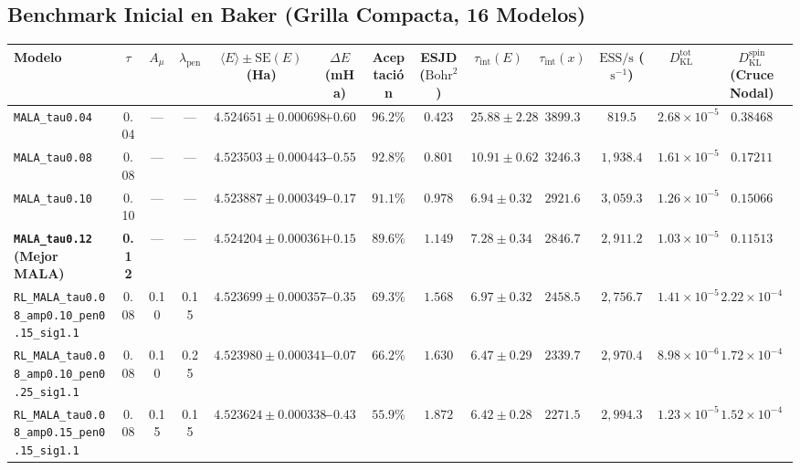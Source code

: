 \documentclass[10pt,a4paper]{article}
\begin{document}
\subsection{Benchmark Inicial en Baker (Grilla Compacta, 16 Modelos)}



\begin{table}[H]
\centering
\begin{adjustbox}{max width=\textwidth}
\begin{tabular}{lcccccccccccc}
\toprule
\textbf{Modelo} & \textbf{$\tau$} & \textbf{$A_\mu$} & \textbf{$\lambda_{\mathrm{pen}}$} & \textbf{$\langle E \rangle \pm \mathrm{SE}(E)$ (Ha)} & \textbf{$\Delta E$ (mHa)} & \textbf{Aceptación} & \textbf{ESJD ($\text{Bohr}^2$)} & \textbf{$\tau_{\mathrm{int}}(E)$} & \textbf{$\tau_{\mathrm{int}}(x)$} & \textbf{$\mathrm{ESS/s}$ ($\text{s}^{-1}$)} & \textbf{$D_{\mathrm{KL}}^{\mathrm{tot}}$} & \textbf{$D_{\mathrm{KL}}^{\mathrm{spin}}$ (Cruce Nodal)} \\
\midrule
\texttt{MALA\_tau0.04} & 0.04 & --- & --- & $4.524651 \pm 0.000698$ & $+0.60$ & $96.2\%$ & $0.423$ & $25.88 \pm 2.28$ & $3899.3$ & $819.5$ & $2.68 \times 10^{-5}$ & $0.38468$ \\
\texttt{MALA\_tau0.08} & 0.08 & --- & --- & $4.523503 \pm 0.000443$ & $-0.55$ & $92.8\%$ & $0.801$ & $10.91 \pm 0.62$ & $3246.3$ & $1,938.4$ & $1.61 \times 10^{-5}$ & $0.17211$ \\
\texttt{MALA\_tau0.10} & 0.10 & --- & --- & $4.523887 \pm 0.000349$ & $-0.17$ & $91.1\%$ & $0.978$ & $6.94 \pm 0.32$ & $2921.6$ & $3,059.3$ & $1.26 \times 10^{-5}$ & $0.15066$ \\
\textbf{\texttt{MALA\_tau0.12} (Mejor MALA)} & \textbf{0.12} & --- & --- & \textbf{$4.524204 \pm 0.000361$} & \textbf{$+0.15$} & \textbf{$89.6\%$} & \textbf{$1.149$} & \textbf{$7.28 \pm 0.34$} & \textbf{$2846.7$} & \textbf{$2,911.2$} & \textbf{$1.03 \times 10^{-5}$} & \textbf{$0.11513$} \\
\texttt{RL\_MALA\_tau0.08\_amp0.10\_pen0.15\_sig1.1} & 0.08 & 0.10 & 0.15 & $4.523699 \pm 0.000357$ & $-0.35$ & $69.3\%$ & $1.568$ & $6.97 \pm 0.32$ & $2458.5$ & $2,756.7$ & $1.41 \times 10^{-5}$ & $2.22 \times 10^{-4}$ \\
\texttt{RL\_MALA\_tau0.08\_amp0.10\_pen0.25\_sig1.1} & 0.08 & 0.10 & 0.25 & $4.523980 \pm 0.000341$ & $-0.07$ & $66.2\%$ & $1.630$ & $6.47 \pm 0.29$ & $2339.7$ & $2,970.4$ & $8.98 \times 10^{-6}$ & $1.72 \times 10^{-4}$ \\
\texttt{RL\_MALA\_tau0.08\_amp0.15\_pen0.15\_sig1.1} & 0.08 & 0.15 & 0.15 & $4.523624 \pm 0.000338$ & $-0.43$ & $55.9\%$ & $1.872$ & $6.42 \pm 0.28$ & $2271.5$ & $2,994.3$ & $1.23 \times 10^{-5}$ & $1.52 \times 10^{-4}$ \\

\end{tabular}
\end{adjustbox}
\end{table}
\end{document}
